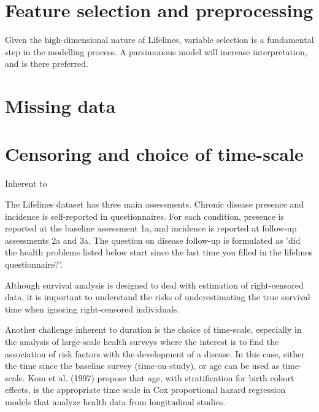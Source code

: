 \section{Feature selection and preprocessing}
\label{section:data:feature_selection_and_preprocessing}
Given the high-dimensional nature of Lifelines, variable selection is a fundamental step in the modelling process. A parsimonous model will increase interpretation, and is there preferred.  


\section{Missing data}
\label{section:data:missing_data}


\section{Censoring and choice of time-scale}
\label{section:data:timescale_censoring}
\noindent Inherent to 

The Lifelines dataset has three main assessments. Chronic disease presence and incidence is self-reported in questionnaires. For each condition, presence is reported at the baseline assessment 1a, and incidence is reported at follow-up assessments 2a and 3a. The question on disease follow-up is formulated as 'did the health problems listed below start since the last time you filled in the lifelines questionnaire?'. 



  



Although survival analysis is designed to deal with estimation of right-censored data, it is important to understand the risks of underestimating the true survival time when ignoring right-censored individuals. 

Another challenge inherent to duration is the choice of time-scale, especially in the analysis of large-scale health surveys where the interest is to find the association of risk factors with the development of a disease. In this case, either the time since the baseline survey (time-on-study), or age can be used as time-scale. %
Kom et al. (1997) \cite{kom1997time} propose that age, with stratification for birth cohort effects, is the appropriate time scale in Cox proportional hazard regression models that analyze health data from longitudinal studies.  